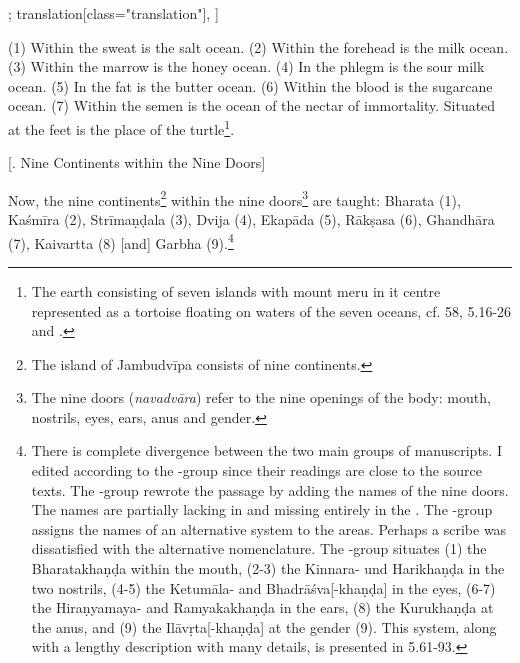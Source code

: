 \begin{alignment}[
  texts=edition[class="edition"];
  translation[class="translation"],
  ]
\begin{translation}
\begin{tlate}
  (1) Within the sweat is the salt ocean. (2) Within the forehead is the milk ocean. (3) Within the marrow is the honey ocean. (4) In the phlegm is the sour milk ocean. (5) In the fat is the butter ocean. (6) Within the blood is the sugarcane ocean. (7) Within the semen is the ocean of the nectar of immortality. Situated at the feet is the place of the turtle\footnote{The earth consisting of seven islands with mount meru in it centre represented as a tortoise floating on waters of the seven oceans, cf.  58,  5.16-26 and \citeauthor[2009:354]{bryant2009}.}.
\end{tlate}
\begin{tlate}
  \bigskip
  \centerline{\textrm{\small{[. Nine Continents within the Nine Doors]}}}
  \bigskip
  Now, the nine continents\footnote{The island of Jambudvīpa consists of nine continents.} within the nine doors\footnote{The nine doors (\textit{navadvāra}) refer to the nine openings of the body: mouth, nostrils, eyes, ears, anus and gender.} are taught: Bharata (1), Kaśmīra (2), Strīmaṇḍala (3), Dvija (4), Ekapāda (5), Rākṣasa (6), Ghandhāra (7), Kaivartta (8) [and] Garbha (9).\footnote{There is complete divergence between the two main groups of manuscripts. I edited according to the \alpha-group since their readings are close to the source texts. The \beta-group rewrote the passage by adding the names of the nine doors. The names are partially lacking in  and missing entirely in the . The \beta-group assigns the names of an alternative system to the areas. Perhaps a scribe was dissatisfied with the alternative nomenclature. The \beta-group situates (1) the Bharatakhaṇḍa within the mouth, (2-3) the Kinnara- und Harikhaṇḍa in the two nostrils, (4-5) the Ketumāla- and Bhadrāśva[-khaṇḍa] in the eyes, (6-7) the Hiraṇyamaya- and Ramyakakhaṇḍa in the ears, (8) the Kurukhaṇḍa at the anus, and (9) the Ilāvṛta[-khaṇḍa] at the gender (9). This system, along with a lengthy description with many details, is presented in  5.61-93.}
  \end{tlate}
  \end{translation}
\end{alignment}
\pagebreak %
